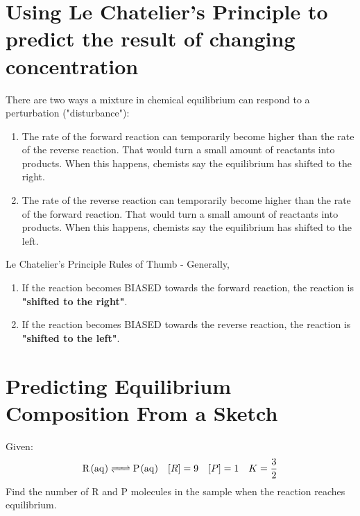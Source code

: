 \documentclass{article}  %
\begin{document}
\section*{Using Le Chatelier's Principle to predict the result of changing concentration}
There are two ways a mixture in chemical equilibrium can respond to a perturbation ("disturbance"):
\begin{enumerate}
    \item The rate of the forward reaction can temporarily become higher than the rate of the reverse reaction. That would turn a small amount of reactants into products. When this happens, chemists say the equilibrium has shifted to the right.
    \item The rate of the reverse reaction can temporarily become higher than the rate of the forward reaction. That would turn a small amount of reactants into products.  When this happens, chemists say the equilibrium has shifted to the left.
\end{enumerate}
Le Chatelier's Principle Rules of Thumb - Generally,
\begin{enumerate}
    \item If the reaction becomes BIASED towards the forward reaction, the reaction is \textbf{"shifted to the right"}.
    \item If the reaction becomes BIASED towards the reverse reaction, the reaction is \textbf{"shifted to the left"}.
\end{enumerate}

\section*{Predicting Equilibrium Composition From a Sketch}
Given:\\
\begin{equation*}
    \begin{aligned}
        \ce{R_(aq) <=> P_(aq)} \quad [R] = 9 \quad [P] = 1 \quad K = \frac{3}{2}
    \end{aligned}
\end{equation*} 
Find the number of R and P molecules in the sample when the reaction reaches equilibrium.
\end{document}
